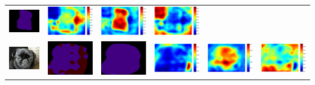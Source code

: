 \documentclass[landscape,final,a0paper,fontscale=0.285]{baposter}
\begin{document}
\begin{poster}
{{\begin{tabular}{c c c c c c}
      {\includegraphics[height=0.09\linewidth]{fig/attention/voc12/res_sharenet/2011_001642.png}} &
      {\includegraphics[height=0.09\linewidth]{fig/attention/voc12/att1/2011_001642.pdf}} &
      {\includegraphics[height=0.09\linewidth]{fig/attention/voc12/att2/2011_001642.pdf}} &
      {\includegraphics[height=0.09\linewidth]{fig/attention/voc12/att3/2011_001642.pdf}} \\
   \includegraphics[height=0.09\linewidth]{fig/attention/voc12/img/2011_002121.jpg} &
      {\includegraphics[height=0.09\linewidth]{fig/attention/voc12/res_baseline/2011_002121.png}} &
      {\includegraphics[height=0.09\linewidth]{fig/attention/voc12/res_sharenet/2011_002121.png}} &
      {\includegraphics[height=0.09\linewidth]{fig/attention/voc12/att1/2011_002121.pdf}} &
      {\includegraphics[height=0.09\linewidth]{fig/attention/voc12/att2/2011_002121.pdf}} &
      {\includegraphics[height=0.09\linewidth]{fig/attention/voc12/att3/2011_002121.pdf}} \\

\end{tabular}}}
\end{poster}
\end{document}

